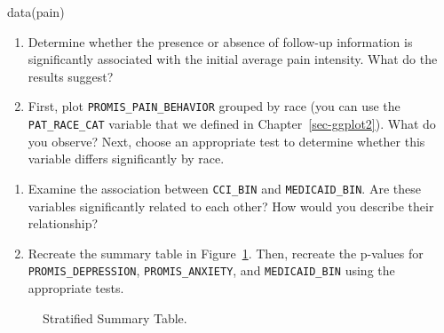 \documentclass[
  letterpaper,
]{latex/krantz}
\makeatletter
\newenvironment{Shaded}{\begin{snugshade}}{\end{snugshade}}
\newcommand{\FunctionTok}[1]{\textcolor[rgb]{0.28,0.35,0.67}{#1}}
\newcommand{\NormalTok}[1]{\textcolor[rgb]{0.00,0.23,0.31}{#1}}
\newenvironment{kframe}{%
\medskip{}
\setlength{\fboxsep}{.8em}
 \def\at@end@of@kframe{}%
 \ifinner\ifhmode%
  \def\at@end@of@kframe{\end{minipage}}%
  \begin{minipage}{\columnwidth}%
 \fi\fi%
 \def\FrameCommand##1{\hskip\@totalleftmargin \hskip-\fboxsep
 \colorbox{shadecolor}{##1}\hskip-\fboxsep
     \hskip-\linewidth \hskip-\@totalleftmargin \hskip\columnwidth}%
 \MakeFramed {\advance\hsize-\width
   \@totalleftmargin\z@ \linewidth\hsize
   \@setminipage}}%
 {\par\unskip\endMakeFramed%
 \at@end@of@kframe}
\renewenvironment{Shaded}{\begin{kframe}}{\end{kframe}}
\makeatother
\begin{document}
\begin{Shaded}
\begin{Highlighting}[]
\FunctionTok{data}\NormalTok{(pain)}
\end{Highlighting}
\end{Shaded}

\begin{enumerate}
\def\labelenumi{\arabic{enumi}.}
\item
  Determine whether the presence or absence of follow-up information is
  significantly associated with the initial average pain intensity. What
  do the results suggest?
\item
  First, plot \texttt{PROMIS\_PAIN\_BEHAVIOR} grouped by race (you can
  use the \texttt{PAT\_RACE\_CAT} variable that we defined in
  Chapter~\ref{sec-ggplot2}). What do you observe? Next, choose an
  appropriate test to determine whether this variable differs
  significantly by race.
\end{enumerate}

\newpage

\begin{enumerate}
\def\labelenumi{\arabic{enumi}.}
\setcounter{enumi}{2}
\item
  Examine the association between \texttt{CCI\_BIN} and
  \texttt{MEDICAID\_BIN}. Are these variables significantly related to
  each other? How would you describe their relationship?
\item
  Recreate the summary table in
  Figure~\ref{fig-pain-stratified-summary}. Then, recreate the p-values
  for \texttt{PROMIS\_DEPRESSION}, \texttt{PROMIS\_ANXIETY}, and
  \texttt{MEDICAID\_BIN} using the appropriate tests.
\end{enumerate}

\begin{figure}


\caption{\label{fig-pain-stratified-summary}Stratified Summary Table.}

\end{figure}%
\end{document}
